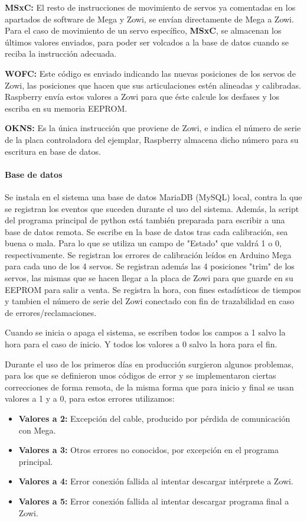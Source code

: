 \textbf{MSxC:}
El resto de instrucciones de movimiento de servos ya comentadas en los apartados de software de Mega y Zowi, se envían directamente de Mega a Zowi. Para el caso de movimiento de un servo específico, \textbf{MSxC}, se almacenan los últimos valores enviados, para poder ser volcados a la base de datos cuando se reciba la instrucción adecuada.

\textbf{WOFC:}
Este código es enviado indicando las nuevas posiciones de los servos de Zowi, las posiciones que hacen que sus articulaciones estén alineadas y calibradas. Raspberry envía estos valores a Zowi para que éste calcule los desfases y los escriba en su memoria EEPROM.

\textbf{OKNS:}
Es la única instrucción que proviene de Zowi, e indica el número de serie de la placa controladora del ejemplar, Raspberry almacena dicho número para su escritura en base de datos.

\paragraph{Base de datos}

Se instala en el sistema una base de datos MariaDB (MySQL) local, contra la que se registran los eventos que suceden durante el uso del sistema. Además, la script del programa principal de python está también preparada para escribir a una base de datos remota.
Se escribe en la base de datos tras cada calibración, sea buena o mala. Para lo que se utiliza un campo de "Estado" que valdrá 1 o 0, respectivamente.
Se registran los errores de calibración leídos en Arduino Mega para cada uno de los 4 servos.
Se registran además las 4 posiciones "trim" de los servos, las mismas que se hacen llegar a la placa de Zowi para que guarde en su EEPROM para salir a venta.
Se registra la hora, con fines estadísticos de tiempos y tambien el número de serie del Zowi conectado con fin de trazabilidad en caso de errores/reclamaciones.

Cuando se inicia o apaga el sistema, se escriben todos los campos a 1 salvo la hora para el caso de inicio. Y todos los valores a 0 salvo la hora para el fin.

Durante el uso de los primeros días en producción surgieron algunos problemas, para los que se definieron unos códigos de error y se implementaron ciertas correcciones de forma remota, de la misma forma que para inicio y final se usan valores a 1 y a 0, para estos errores utilizamos:

\begin{itemize}
  \item \textbf{Valores a 2:} Excepción del cable, producido por pérdida de comunicación con Mega.
  \item \textbf{Valores a 3:} Otros errores no conocidos, por excepción en el programa principal.
  \item \textbf{Valores a 4:} Error conexión fallida al intentar descargar intérprete a Zowi.
  \item \textbf{Valores a 5:} Error conexión fallida al intentar descargar programa final a Zowi.
\end{itemize}

